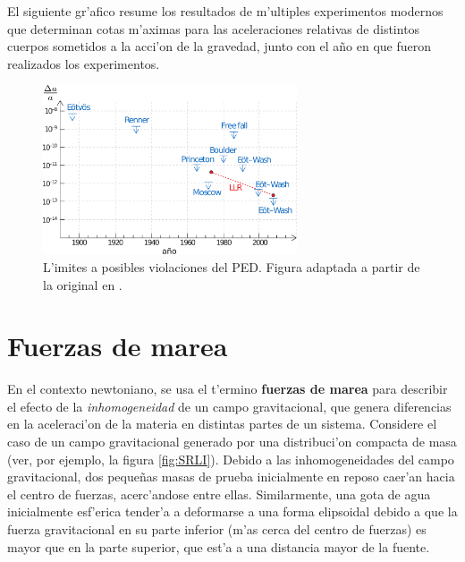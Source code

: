 El siguiente gr'afico resume los resultados de m'ultiples experimentos modernos que determinan cotas m'aximas para las aceleraciones relativas de distintos cuerpos sometidos a la acci'on de la gravedad, junto con el a\~no en que fueron realizados los experimentos.
\begin{center}
\begin{figure}[H]
\centerline{\includegraphics[height=5cm]{fig/fig-tests-PED.pdf}}
\caption{L'imites a posibles violaciones del PED. Figura adaptada a partir de la original en \cite{Turyshev08}.}
\label{fig:equiv1}
\end{figure}
\end{center}

\section{Fuerzas de marea}
En el contexto newtoniano, se usa el t'ermino \textbf{fuerzas de marea} para describir el efecto de la \textit{inhomogeneidad} de un campo gravitacional, que genera diferencias en la aceleraci'on de la materia en distintas partes de un sistema. Considere el caso de un campo gravitacional generado por una distribuci'on compacta de masa (ver, por ejemplo, la figura \ref{fig:SRLI}). Debido a las inhomogeneidades del campo gravitacional, dos peque\~nas masas de prueba inicialmente en reposo caer'an hacia el centro de fuerzas, acerc'andose entre ellas. Similarmente, una gota de agua inicialmente esf'erica tender'a a deformarse a una forma elipsoidal debido a que la fuerza gravitacional en su parte inferior (m'as cerca del centro de fuerzas) es mayor que en la parte superior, que est'a a una distancia mayor de la fuente.

